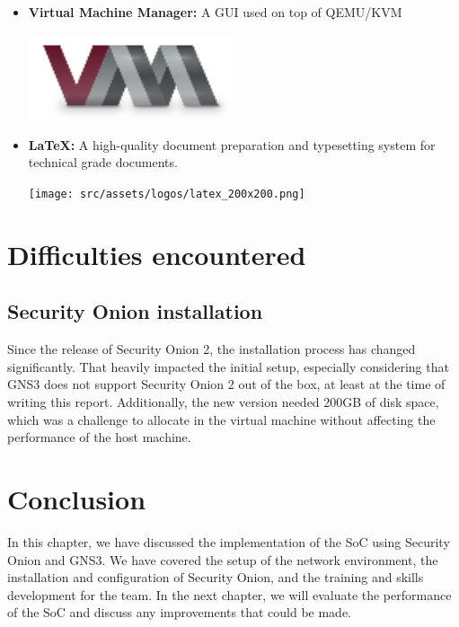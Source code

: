 \begin{itemize}
    \item \textbf{Virtual Machine Manager:} \newline \cite{kvm} A GUI used on top of QEMU/KVM \newline
          \begin{minipage}{\linewidth}
              \centering
              \includegraphics[width=6cm]{src/assets/logos/virt-manager.png}
          \end{minipage}
    \item \textbf{LaTeX:} \newline \cite{latex-project} A high-quality document preparation and typesetting system for technical grade documents. \newline \newline
          \begin{minipage}{\linewidth}
              \centering
              \texttt{[image: src/assets/logos/latex\_200x200.png]}
          \end{minipage}

          \newpage
\end{itemize}

\section{Difficulties encountered}
\subsection{Security Onion installation}
Since the release of Security Onion 2, the installation process has changed significantly.
That heavily impacted the initial setup, especially considering that GNS3 does not support Security Onion 2 out of the box, at least at the time of writing this report.
Additionally, the new version needed 200GB of disk space, which was a challenge to allocate in the virtual machine without affecting the performance of the host machine.

\setcounter{secnumdepth}{0} %
\section{Conclusion}
In this chapter, we have discussed the implementation of the SoC using Security Onion and GNS3.
We have covered the setup of the network environment, the installation and configuration of Security Onion, and the training and skills development for the team.
In the next chapter, we will evaluate the performance of the SoC and discuss any improvements that could be made.
